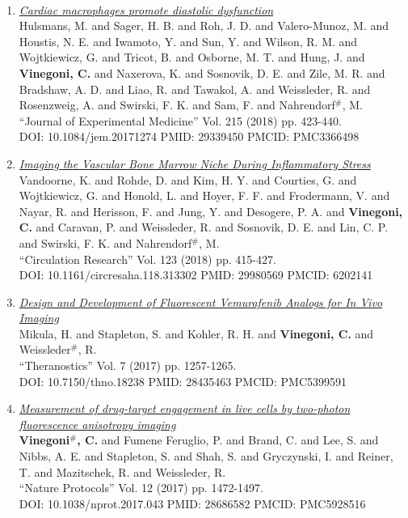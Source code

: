 \documentclass{resume}
\begin{document}
\begin{category}{~~}
\begin{enumerate}
\item \href{https://cvinegoni.github.io/assets/pdf/papers/2018-JEM.pdf}{\it  Cardiac macrophages promote diastolic dysfunction} \\ Hulsmans, M. and Sager, H. B. and Roh, J. D. and Valero-Munoz, M. and Houstis, N. E. and Iwamoto, Y. and Sun, Y. and Wilson, R. M. and Wojtkiewicz, G. and Tricot, B. and Osborne, M. T. and Hung, J. and {\bf Vinegoni, C.} and Naxerova, K. and Sosnovik, D. E. and Zile, M. R. and Bradshaw, A. D. and Liao, R. and Tawakol, A. and Weissleder, R. and Rosenzweig, A. and Swirski, F. K. and Sam, F. and Nahrendorf$^\#$, M. \\ ``Journal of Experimental Medicine'' Vol. 215 (2018) pp. 423-440. \\ DOI: 10.1084/jem.20171274 PMID: 29339450 PMCID: PMC3366498

\item \href{https://cvinegoni.github.io/assets/pdf/papers/2018-CIRCRES.pdf}{\it  Imaging the Vascular Bone Marrow Niche During Inflammatory Stress} \\ Vandoorne, K. and Rohde, D. and Kim, H. Y. and Courties, G. and Wojtkiewicz, G. and Honold, L. and Hoyer, F. F. and Frodermann, V. and Nayar, R. and Herisson, F. and Jung, Y. and Desogere, P. A. and {\bf Vinegoni, C.} and Caravan, P. and Weissleder, R. and Sosnovik, D. E. and Lin, C. P. and Swirski, F. K. and Nahrendorf$^\#$, M. \\ ``Circulation Research'' Vol. 123 (2018) pp. 415-427. \\ DOI: 10.1161/circresaha.118.313302 PMID: 29980569 PMCID: 6202141

\item \href{https://cvinegoni.github.io/assets/pdf/papers/2017-THERA.pdf}{\it  Design and Development of Fluorescent Vemurafenib Analogs for In Vivo Imaging} \\ Mikula, H. and Stapleton, S. and Kohler, R. H. and {\bf Vinegoni, C.} and Weissleder$^\#$, R. \\ ``Theranostics'' Vol. 7 (2017) pp. 1257-1265. \\ DOI: 10.7150/thno.18238 PMID: 28435463 PMCID: PMC5399591

\item \href{https://cvinegoni.github.io/assets/pdf/papers/2017-NP.pdf}{\it  Measurement of drug-target engagement in live cells by two-photon fluorescence anisotropy imaging} \\ {\bf Vinegoni$^\#$, C.} and Fumene Feruglio, P. and Brand, C. and Lee, S. and Nibbs, A. E. and Stapleton, S. and Shah, S. and Gryczynski, I. and Reiner, T. and Mazitschek, R. and Weissleder, R. \\ ``Nature Protocols'' Vol. 12 (2017) pp. 1472-1497. \\ DOI: 10.1038/nprot.2017.043 PMID: 28686582 PMCID: PMC5928516


\end{enumerate}
\end{category}
\end{document}
